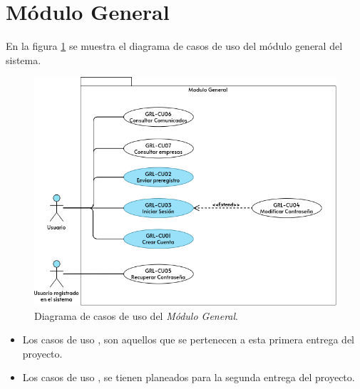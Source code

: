 \section{Módulo General}
	En la figura \ref{adcu:grl} se muestra el diagrama de casos de uso del módulo general del sistema.

	\begin{figure}[hbtp!]
		\begin{center}
			\includegraphics[width=.8\textwidth]{sprints/imagenes/CUGRL.png}
		\end{center}
		
		\caption{Diagrama de casos de uso del \textit{Módulo General}.}
		\label{adcu:grl}
	\end{figure}

	\begin{itemize}
        \item Los casos de uso \IUazul{} , son aquellos que se pertenecen a esta primera entrega del proyecto.
        \item Los casos de uso \IUblanco{}, se tienen planeados para la segunda entrega del proyecto.
    \end{itemize} 

	
	

	
	

	
	

	
	

	
	
	
	
	

